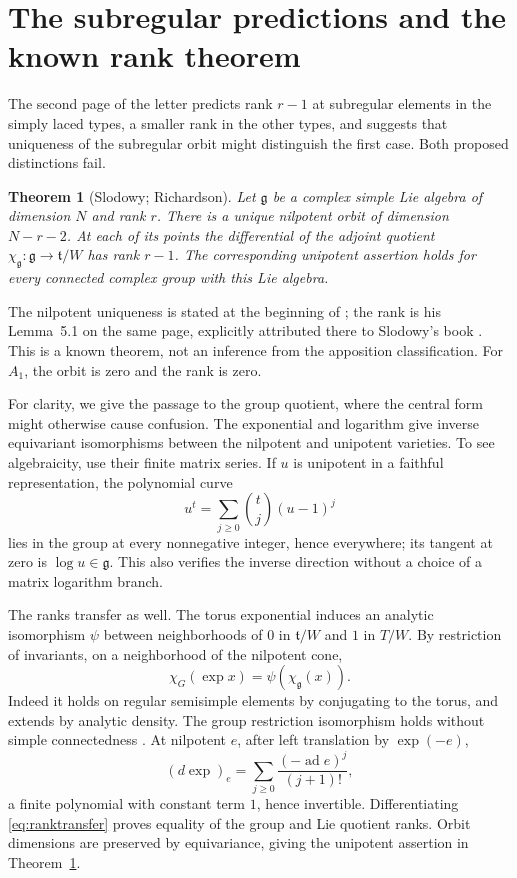 \documentclass[11pt]{article}
\newcommand{\g}{\mathfrak g}\newcommand{\tfr}{\mathfrak t}
\newtheorem{theorem}{Theorem}[section]
\theoremstyle{definition}\newtheorem{definition}[theorem]{Definition}
\theoremstyle{remark}\newtheorem{remark}[theorem]{Remark}
\begin{document}
\section{The subregular predictions and the known rank theorem}\label{sec:subregular}
The second page of the letter predicts rank $r-1$ at subregular elements in the simply laced types, a smaller rank in the other types, and suggests that uniqueness of the subregular orbit might distinguish the first case. Both proposed distinctions fail.

\begin{theorem}[Slodowy; Richardson]\label{thm:subregular}
Let $\g$ be a complex simple Lie algebra of dimension $N$ and rank $r$. There is a unique nilpotent orbit of dimension $N-r-2$. At each of its points the differential of the adjoint quotient $\chi_{\g}:\g\to\tfr/W$ has rank $r-1$. The corresponding unipotent assertion holds for every connected complex group with this Lie algebra.
\end{theorem}

The nilpotent uniqueness is stated at the beginning of \citet[\S5, p.~234]{Richardson1987}; the rank is his Lemma~5.1 on the same page, explicitly attributed there to Slodowy's book \citep{Slodowy1980}. This is a known theorem, not an inference from the apposition classification. For $A_1$, the orbit is zero and the rank is zero.

For clarity, we give the passage to the group quotient, where the central form might otherwise cause confusion. The exponential and logarithm give inverse equivariant isomorphisms between the nilpotent and unipotent varieties. To see algebraicity, use their finite matrix series. If $u$ is unipotent in a faithful representation, the polynomial curve
\[
 u^t=\sum_{j\geq0}\binom tj(u-1)^j
\]
lies in the group at every nonnegative integer, hence everywhere; its tangent at zero is $\log u\in\g$. This also verifies the inverse direction without a choice of a matrix logarithm branch.

The ranks transfer as well. The torus exponential induces an analytic isomorphism $\psi$ between neighborhoods of $0$ in $\tfr/W$ and $1$ in $T/W$. By restriction of invariants, on a neighborhood of the nilpotent cone,
\begin{equation}\label{eq:ranktransfer}
 \chi_G(\exp x)=\psi(\chi_{\g}(x)).
\end{equation}
Indeed it holds on regular semisimple elements by conjugating to the torus, and extends by analytic density. The group restriction isomorphism holds without simple connectedness \citep[Corollary~6.4, p.~63]{Steinberg1965}. At nilpotent $e$, after left translation by $\exp(-e)$,
\[
 (d\exp)_e=\sum_{j\geq0}\frac{(-\operatorname{ad}e)^j}{(j+1)!},
\]
a finite polynomial with constant term $1$, hence invertible. Differentiating \eqref{eq:ranktransfer} proves equality of the group and Lie quotient ranks. Orbit dimensions are preserved by equivariance, giving the unipotent assertion in Theorem~\ref{thm:subregular}.
\end{document}
